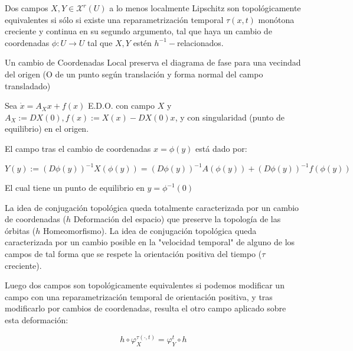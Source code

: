 \begin{cor}
	Dos campos $X,Y\in \mathcal{X}^r(U)$ a lo menos localmente Lipschitz son topológicamente equivalentes si sólo si existe una reparametrización temporal $\tau(x,t)$ monótona creciente y continua en su segundo argumento, tal que haya un cambio de coordenadas $\phi:U\to U$ tal que $X,Y$ estén $h^{-1}-$relacionados.
\end{cor}

\begin{cor}
	Un cambio de Coordenadas Local preserva el diagrama de fase para una vecindad del origen (O de un punto según translación y forma normal del campo transladado)
\end{cor}

\begin{cor}
	Sea $\dot{x} = A_Xx + f(x)$ E.D.O. con campo $X$ y $A_X:= DX(0), f(x) := X(x) - DX(0)x $, y con singularidad (punto de equilibrio) en el origen.
	
	El campo tras el cambio de coordenadas $x = \phi(y)$ está dado por:
	
	\begin{equation*}
		Y(y) := (D\phi(y))^{-1}X(\phi(y)) = (D\phi(y))^{-1}A(\phi(y)) + (D\phi(y))^{-1}f(\phi(y))
	\end{equation*} 
	
	El cual tiene un punto de equilibrio en $y = \phi^{-1}(0)$
\end{cor}


\begin{rmrk}
	La idea de conjugación topológica queda totalmente caracterizada por un cambio de coordenadas ($h$ Deformación del espacio) que preserve la topología de las órbitas ($h$ Homeomorfismo). La idea de conjugación topológica queda caracterizada por un cambio posible en la "velocidad temporal" de alguno de los campos de tal forma que se respete la orientación positiva del tiempo ($\tau$ creciente). 
	
	Luego dos campos son topológicamente equivalentes si podemos modificar un campo con una reparametrización temporal de orientación positiva, y tras modificarlo por cambios de coordenadas, resulta el otro campo aplicado sobre esta deformación:
	
	\begin{equation*}
		h \circ \varphi_X^{\tau(\cdot,t)} = \varphi_Y^t\circ h 
	\end{equation*}
\end{rmrk}


